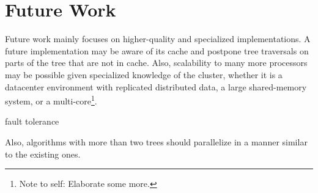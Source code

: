 \documentclass[twoside,leqno,twocolumn]{article}
\newcommand{\authornote}[1]{\footnote{Note to self: #1}}
\newcommand{\authorsnote}[1]{\authornote{#1}}
\begin{document}
\section{Future Work}

Future work mainly focuses on higher-quality and specialized implementations.
A future implementation may be aware of its cache and postpone tree traversals on parts of the tree that are not in cache.
Also, scalability to many more processors may be possible given specialized knowledge of the cluster, whether it is a datacenter environment with replicated distributed data, a large shared-memory system, or a multi-core\authorsnote{Elaborate some more.}.

fault tolerance

Also, algorithms with more than two trees should parallelize in a manner similar to the existing ones.



\end{document}
